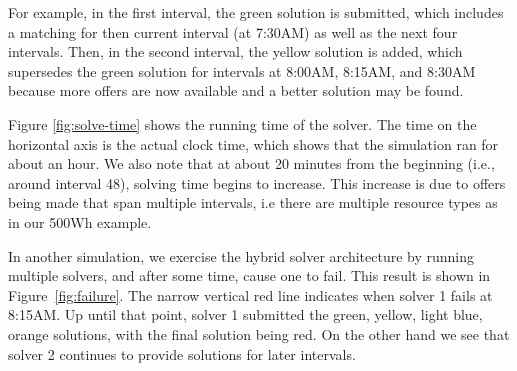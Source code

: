 \ifExtended
For example, in the first interval, the green solution is submitted, which includes a matching for then current interval (at 7:30AM) as well as the next four intervals.
Then, in the second interval, the yellow solution is added, which supersedes the green solution for intervals at 8:00AM, 8:15AM, and 8:30AM because more offers are now available and a better solution may be found. %
\fi


\ifExtended
Figure \ref{fig:solve-time} shows the running time of the solver.
The time on the horizontal axis is the actual clock time, which shows that the simulation ran for about an hour. We also note that at about 20 minutes from the beginning (i.e., around interval 48), %
solving time begins to increase. 
This increase is due to offers being made that span multiple intervals, i.e there are multiple resource types as in our 500Wh example.
\fi

In another simulation, we exercise the hybrid solver architecture by running multiple solvers, and after some time, cause one to fail. This result is shown in Figure~\ref{fig:failure}. The narrow vertical red line indicates when solver 1 fails at 8:15AM. Up until that point, solver 1 submitted the green, yellow, light blue, orange solutions, with the final solution being red.%
On the other hand we see that solver 2 continues to provide solutions for later intervals. 


